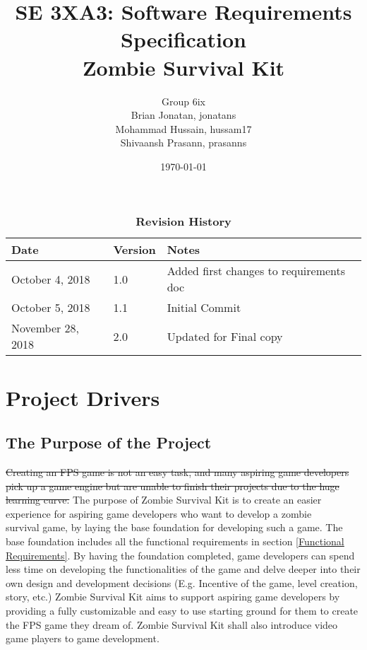 \documentclass[12pt, titlepage]{article}
\title{SE 3XA3: Software Requirements Specification\\Zombie Survival Kit}
\author{{\color{magenta} Group 6ix}
		\\ Brian Jonatan, jonatans
		\\ Mohammad Hussain, hussam17
		\\ Shivaansh Prasann, prasanns
}
\date{\today}
\begin{document}
\maketitle

\tableofcontents
\listoftables
\listoffigures

\begin{table}[bp]
\caption{\bf Revision History}
\begin{tabularx}{\textwidth}{p{3cm}p{2cm}X}
\toprule {\bf Date} & {\bf Version} & {\bf Notes}\\
\midrule
October 4, 2018 & 1.0 & Added first changes to requirements doc\\
October 5, 2018 & 1.1 & Initial Commit\\
{\color{magenta} November 28, 2018} & {\color{magenta}2.0} & {\color{magenta}Updated for Final copy}\\
\bottomrule
\end{tabularx}
\end{table}

\newpage



\section{Project Drivers}

\subsection{The Purpose of the Project}
\sout{Creating an FPS game is not an easy task, and many aspiring game developers pick up a game engine but are unable to finish their projects due to the huge learning curve.}
{\color{magenta} The purpose of Zombie Survival Kit is to create an easier experience for aspiring game developers who want to develop a zombie\\ survival game, by laying the base foundation for developing such a game. The base foundation includes all the functional requirements in section \ref{Functional Requirements}. By having the foundation completed, game developers can spend less time on developing the functionalities of the game and delve deeper into their own design  and development decisions (E.g. Incentive of the game, level creation, story, etc.)}
\newline
\newline
Zombie Survival Kit aims to support aspiring game developers by providing a fully customizable and easy to use starting ground for them to create the FPS game they dream of. Zombie Survival Kit shall also introduce video game players to game development.
\end{document}
